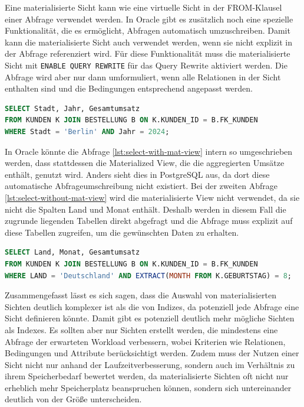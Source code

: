 Eine materialisierte Sicht kann wie eine virtuelle Sicht in der FROM-Klausel einer Abfrage verwendet werden.
In Oracle gibt es zusätzlich noch eine spezielle Funktionalität, die es ermöglicht, Abfragen automatisch umzuschreiben.
Damit kann die materialisierte Sicht auch verwendet werden, wenn sie nicht explizit in der Abfrage referenziert wird.
Für diese Funktionalität muss die materialisierte Sicht mit \texttt{ENABLE QUERY REWRITE} für das Query Rewrite aktiviert werden.
Die Abfrage wird aber nur dann umformuliert, wenn alle Relationen in der Sicht enthalten sind und die Bedingungen entsprechend angepasst werden.

\vspace{-5pt}
\begin{lstlisting}[language=SQL,caption=Select mit View,label={lst:select-with-mat-view}]
SELECT Stadt, Jahr, Gesamtumsatz
FROM KUNDEN K JOIN BESTELLUNG B ON K.KUNDEN_ID = B.FK_KUNDEN
WHERE Stadt = 'Berlin' AND Jahr = 2024;
\end{lstlisting}
\vspace{-5pt}

In Oracle könnte die Abfrage \ref{lst:select-with-mat-view} intern so umgeschrieben werden, dass stattdessen die Materialized View, die die aggregierten Umsätze enthält, genutzt wird.
Anders sieht dies in PostgreSQL aus, da dort diese automatische Abfrageumschreibung nicht existiert.
Bei der zweiten Abfrage \ref{lst:select-without-mat-view} wird die materialisierte View nicht verwendet, da sie nicht die Spalten Land und Monat enthält.
Deshalb werden in diesem Fall die zugrunde liegenden Tabellen direkt abgefragt und die Abfrage muss explizit auf diese Tabellen zugreifen, um die gewünschten Daten zu erhalten.

\vspace{-5pt}
\begin{lstlisting}[language=SQL,caption=Select nicht für View,label={lst:select-without-mat-view}]
SELECT Land, Monat, Gesamtumsatz
FROM KUNDEN K JOIN BESTELLUNG B ON K.KUNDEN_ID = B.FK_KUNDEN
WHERE LAND = 'Deutschland' AND EXTRACT(MONTH FROM K.GEBURTSTAG) = 8;
\end{lstlisting}
\vspace{-5pt}


Zusammengefasst lässt es sich sagen, dass die Auswahl von materialisierten Sichten deutlich komplexer ist als die von Indizes, da potenziell jede Abfrage eine Sicht definieren könnte.
Damit gibt es potenziell deutlich mehr mögliche Sichten als Indexes.
Es sollten aber nur Sichten erstellt werden, die mindestens eine Abfrage der erwarteten Workload verbessern, wobei Kriterien wie Relationen, Bedingungen und Attribute berücksichtigt werden.
Zudem muss der Nutzen einer Sicht nicht nur anhand der Laufzeitverbesserung, sondern auch im Verhältnis zu ihrem Speicherbedarf bewertet werden, da materialisierte Sichten oft nicht nur erheblich mehr Speicherplatz beanspruchen können, sondern sich untereinander deutlich von der Größe unterscheiden.

